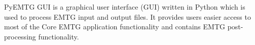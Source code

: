 
PyEMTG GUI is a graphical user interface (GUI) written in Python which is used to process EMTG input and output files. It provides users easier access to most of the Core EMTG application functionality and contains EMTG post-processing functionality.